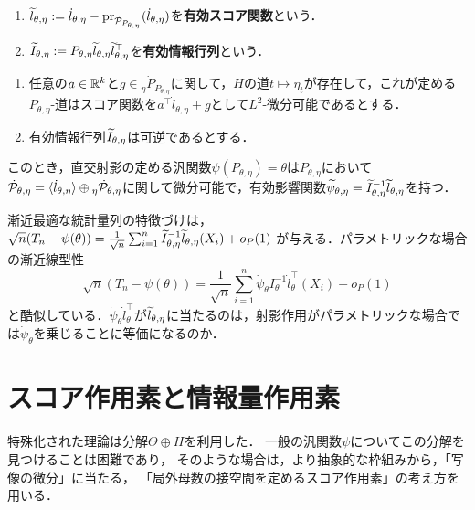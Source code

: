 \documentclass[uplatex,dvipdfmx]{jsreport}
\begin{document}
\begin{definition}\mbox{}
    \begin{enumerate}
        \item $\widetilde{l}_{\theta,\eta}:=\dot{l}_{\theta,\eta}-\mathrm{pr}_{\dot{\mathcal{P}}_{P_{\theta,\eta}}}(\dot{l}_{\theta,\eta})$を\textbf{有効スコア関数}という．
        \item $\widetilde{I}_{\theta,\eta}:=P_{\theta,\eta}\widetilde{l}_{\theta,\eta}\widetilde{l}_{\theta,\eta}^\top$を\textbf{有効情報行列}という．
    \end{enumerate}
\end{definition}

\begin{lemma}[汎関数が直交射影である場合の影響関数]\mbox{}
    \begin{enumerate}[({A}1)]
        \item 任意の$a\in\mathbb{R}^k$と$g\in{}_\eta\dot{P}_{P_{\theta,\eta}}$に関して，$H$の道$t\mapsto \eta_t$が存在して，これが定める$P_{\theta,\eta}$-道はスコア関数を$a^\top\dot{l}_{\theta,\eta}+g$として$L^2$-微分可能であるとする．
        \item 有効情報行列$\widetilde{I}_{\theta,\eta}$は可逆であるとする．
    \end{enumerate}
    このとき，直交射影の定める汎関数$\psi(P_{\theta,\eta})=\theta$は$P_{\theta,\eta}$において$\dot{\mathcal{P}}_{\theta,\eta}=\langle\dot{l}_{\theta,\eta}\rangle\oplus{}_\eta\dot{\mathcal{P}}_{\theta,\eta}$に関して微分可能で，有効影響関数$\widetilde{\psi}_{\theta,\eta}=\widetilde{I}_{\theta,\eta}^{-1}\widetilde{l}_{\theta,\eta}$を持つ．
\end{lemma}
\begin{remarks}
    漸近最適な統計量列の特徴づけは，
    $\sqrt{n}(T_n-\psi(\theta))=\frac{1}{\sqrt{n}}\sum^n_{i=1}\widetilde{I}^{-1}_{\theta,\eta}\widetilde{l}_{\theta,\eta}(X_i)+o_P(1)$
    が与える．パラメトリックな場合の漸近線型性
    \[\sqrt{n}(T_n-\psi(\theta))=\frac{1}{\sqrt{n}}\sum^n_{i=1}\dot{\psi}_\theta I_\theta^{-1}\dot{l}_\theta^\top(X_i)+o_P(1)\]
    と酷似している．$\dot{\psi}_\theta\dot{l}_\theta^\top$が$\widetilde{l}_{\theta,\eta}$に当たるのは，射影作用がパラメトリックな場合では$\dot{\psi}_\theta$を乗じることに等価になるのか．
\end{remarks}

\section{スコア作用素と情報量作用素}

\begin{tcolorbox}[colframe=ForestGreen, colback=ForestGreen!10!white,breakable,colbacktitle=ForestGreen!40!white,coltitle=black,fonttitle=\bfseries\sffamily,
title=]
    特殊化された理論は分解$\Theta\oplus H$を利用した．
    一般の汎関数$\psi$についてこの分解を見つけることは困難であり，
    そのような場合は，より抽象的な枠組みから，「写像の微分」に当たる，
    「局外母数の接空間を定めるスコア作用素」の考え方を用いる．
\end{tcolorbox}
\end{document}
